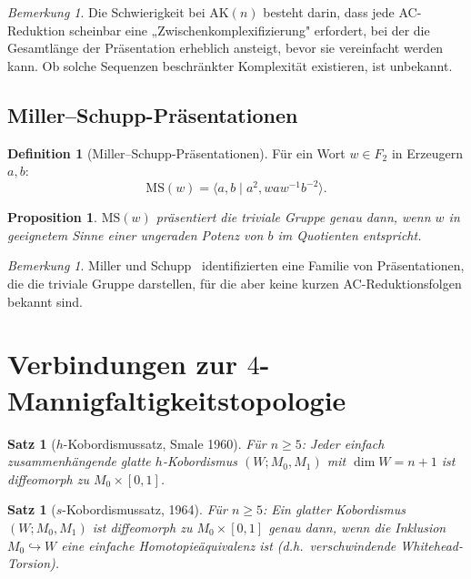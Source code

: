 \documentclass[12pt,a4paper]{amsart}
\newtheorem{satz}[theorem]{Satz}
\newtheorem{proposition}[theorem]{Proposition}
\theoremstyle{definition}
\newtheorem{definition_de}[theorem]{Definition}
\theoremstyle{remark}
\newtheorem{bemerkung}[theorem]{Bemerkung}
\begin{document}
\begin{bemerkung}
Die Schwierigkeit bei $\mathrm{AK}(n)$ besteht darin, dass jede AC-Reduktion
scheinbar eine „Zwischenkomplexifizierung" erfordert, bei der die Gesamtlänge
der Präsentation erheblich ansteigt, bevor sie vereinfacht werden kann.
Ob solche Sequenzen beschränkter Komplexität existieren, ist unbekannt.
\end{bemerkung}

\subsection{Miller--Schupp-Präsentationen}

\begin{definition_de}[Miller--Schupp-Präsentationen]\label{def:MS}
Für ein Wort $w \in F_2$ in Erzeugern $a, b$:
\[
  \mathrm{MS}(w) = \langle a, b \mid a^2, w a w^{-1} b^{-2} \rangle.
\]
\end{definition_de}

\begin{proposition}
$\mathrm{MS}(w)$ präsentiert die triviale Gruppe genau dann, wenn $w$ in geeignetem Sinne
einer ungeraden Potenz von $b$ im Quotienten entspricht.
\end{proposition}

\begin{bemerkung}
Miller und Schupp~\cite{MS99} identifizierten eine Familie von Präsentationen, die
die triviale Gruppe darstellen, für die aber keine kurzen AC-Reduktionsfolgen bekannt sind.
\end{bemerkung}

\section{Verbindungen zur \texorpdfstring{$4$}{4}-Mannigfaltigkeitstopologie}

\begin{satz}[$h$-Kobordismussatz, Smale 1960]\label{satz:hkobord}
Für $n \geq 5$: Jeder einfach zusammenhängende glatte $h$-Kobordismus
$(W; M_0, M_1)$ mit $\dim W = n+1$ ist diffeomorph zu $M_0 \times [0,1]$.
\end{satz}

\begin{satz}[$s$-Kobordismussatz, 1964]\label{satz:skobord}
Für $n \geq 5$: Ein glatter Kobordismus $(W; M_0, M_1)$ ist diffeomorph zu
$M_0 \times [0,1]$ genau dann, wenn die Inklusion $M_0 \hookrightarrow W$ eine
einfache Homotopieäquivalenz ist (d.h.\ verschwindende Whitehead-Torsion).
\end{satz}
\end{document}
